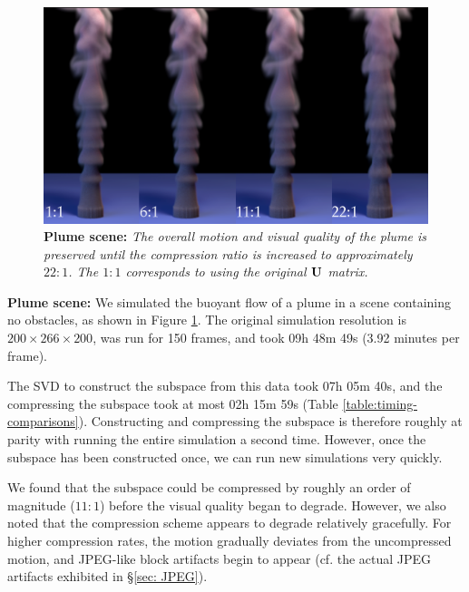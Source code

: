 \begin{figure}[t]
\includegraphics[width=\columnwidth]{chap4/figures/plumeComparison_brighter.png}
\caption{\textbf{Plume scene:} {\em The overall motion and visual quality of the plume is preserved until the compression ratio is increased to approximately $22:1$. The $1:1$ corresponds to using the original $\mathbf{U}$ matrix.}}
\label{fig:plumeComparison}
\end{figure}

\noindent \textbf{Plume scene:} We simulated the buoyant flow of a plume in a scene containing no obstacles, as shown in Figure \ref{fig:plumeComparison}. The original simulation resolution is $200 \times 266 \times 200$, was run for 150 frames, and took 09h 48m 49s (3.92 minutes per frame).

The SVD to construct the subspace from this data took 07h 05m 40s, and the compressing the subspace took at most 02h 15m 59s (Table \ref{table:timing-comparisons}). Constructing and compressing the subspace is therefore roughly at parity with running the entire simulation a second time. However, once the subspace has been constructed once, we can run new simulations very quickly.

We found that the subspace could be compressed by roughly an order of magnitude ($11:1$) before the visual quality began to degrade. However, we also noted that the compression scheme appears to degrade relatively gracefully. For higher compression rates, the motion gradually deviates from the uncompressed motion, and JPEG-like block artifacts begin to appear (cf. the actual JPEG artifacts exhibited in \S\ref{sec: JPEG}).

